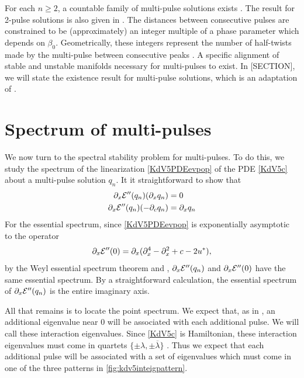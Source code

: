 \documentclass[thesis.tex]{subfiles}
\begin{document}
\noi For each $n \geq 2$, a countable family of multi-pulse solutions exists \cite{Buffoni1996}. The result for 2-pulse solutions is also given in \cite[Theorem 2.2]{Pelinovsky2007}. The distances between consecutive pulses are constrained to be (approximately) an integer multiple of a phase parameter which depends on $\beta_0$. Geometrically, these integers represent the number of half-twists made by the multi-pulse between consecutive peaks \cite{SandstedeStrut}. A specific alignment of stable and unstable manifolds necessary for multi-pulses to exist. In [SECTION], we will state the existence result for multi-pulse solutions, which is an adaptation of \cite[Theorem 3.6]{SandstedeStrut}. 

\section{Spectrum of multi-pulses}

We now turn to the spectral stability problem for multi-pulses. To do this, we study the spectrum of the linearization \cref{KdV5PDEevpop} of the PDE \eqref{KdV5c} about a multi-pulse solution $q_n$. It it straightforward to show that 
\begin{align*}
\partial_x \mathcal{E}''(q_n) (\partial_x q_n) &= 0 \\
\partial_x \mathcal{E}''(q_n) (-\partial_c q_n) &= \partial_x q_n
\end{align*}
For the essential spectrum, since \cref{KdV5PDEevpop} is exponentially asymptotic to the operator 
\[
\partial_x \mathcal{E}''(0) = 
\partial_x(\partial_x^4 - \partial_x^2 + c - 2 u^*),
\]
by the Weyl essential spectrum theorem \cite[Theorem 2.2.6]{Kapitula2013} and \cite[Theorem 3.1.11]{Kapitula2013}, $\partial_x \mathcal{E}''(q_n)$ and $\partial_x \mathcal{E}''(0)$ have the same essential spectrum. By a straightforward calculation, the essential spectrum of $\partial_x \mathcal{E}''(q_n)$ is the entire imaginary axis.

All that remains is to locate the point spectrum. We expect that, as in \cite{Sandstede1998}, an additional eigenvalue near 0 will be associated with each additional pulse. We will call these interaction eigenvalues. Since \cref{KdV5c} is Hamiltonian, these interaction eigenvalues must come in quartets $\{ \pm \lambda, \pm \overline{\lambda}\}$ \cite[Proposition 5.1.2]{Kapitula2013}. Thus we expect that each additional pulse will be associated with a set of eigenvalues which must come in one of the three patterns in \cref{fig:kdv5inteigpattern}.
\end{document}
